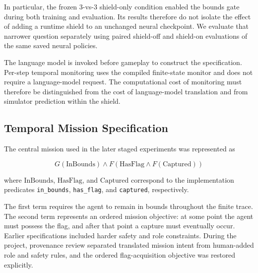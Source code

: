 \documentclass[letterpaper]{article}
\begin{document}
In particular, the frozen 3-vs-3 shield-only condition enabled the bounds gate during both training and evaluation. Its results therefore do not isolate the effect of adding a runtime shield to an unchanged neural checkpoint. We evaluate that narrower question separately using paired shield-off and shield-on evaluations of the same saved neural policies.

The language model is invoked before gameplay to construct the specification. Per-step temporal monitoring uses the compiled finite-state monitor and does not require a language-model request. The computational cost of monitoring must therefore be distinguished from the cost of language-model translation and from simulator prediction within the shield.

\subsection{Temporal Mission Specification}

The central mission used in the later staged experiments was represented as

\[
G(\mathrm{InBounds}) \land
F(\mathrm{HasFlag} \land F(\mathrm{Captured}))
\]

where $\mathrm{InBounds}$, $\mathrm{HasFlag}$, and $\mathrm{Captured}$
correspond to the implementation predicates
\verb|in_bounds|, \verb|has_flag|, and \verb|captured|,
respectively.

The first term requires the agent to remain in bounds throughout the finite trace. The second term represents an ordered mission objective: at some point the agent must possess the flag, and after that point a capture must eventually occur. Earlier specifications included harder safety and role constraints. During the project, provenance review separated translated mission intent from human-added role and safety rules, and the ordered flag-acquisition objective was restored explicitly.
\end{document}
